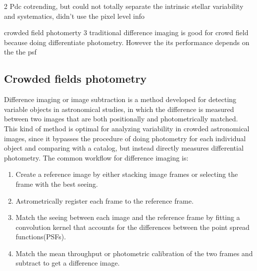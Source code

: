 \documentclass[12pt, preprint]{aastex}
\begin{document}
2 Pdc cotrending, but could not totally separate the intrinsic stellar variability and  systematics, didn’t use the pixel level info

crowded field photomerty
3 traditional difference imaging is good for crowd field because doing differentiate photometry. However the its performance depends on the the psf

\subsection{Crowded fields photometry}
Difference imaging or image subtraction is a method developed for detecting variable objects in astronomical studies, in which the difference is measured between two images that are both positionally and photometrically matched. This kind of method is optimal for analyzing variability in crowded astronomical images, since it bypasses the procedure of doing photometry for each individual object and comparing with a catalog, but instead directly measures differential photometry.
The common workflow for difference imaging is:
\begin{enumerate}
\item
Create a reference image by either stacking image frames or selecting the frame with the best seeing.
\item
Astrometrically register each frame to the reference frame.
\item
Match the seeing between each image and the reference frame by fitting a convolution kernel that accounts for the differences between the point spread functions(PSFs).
\item
Match the mean throughput or photometric calibration of the two frames and subtract to get a difference image.
\end{enumerate}
\end{document}
